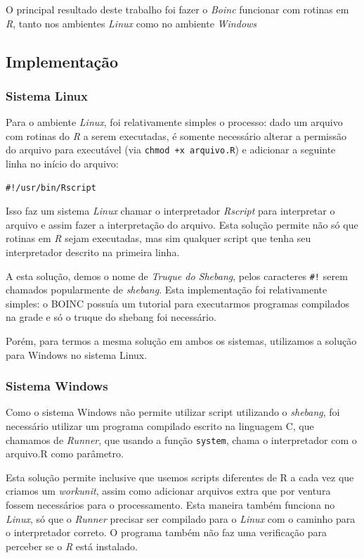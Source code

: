 O principal resultado deste trabalho foi fazer o \emph{Boinc} funcionar com rotinas em \emph{R}, tanto
nos ambientes \emph{Linux} como no ambiente \emph{Windows} %

\subsection{Implementação}

\subsubsection{Sistema Linux}

Para o ambiente \emph{Linux}, foi relativamente simples o processo: dado um arquivo com rotinas
do \emph{R} a serem executadas, é somente necessário alterar a permissão do arquivo para executável 
(via \verb#chmod +x arquivo.R#) e adicionar a seguinte linha no início do arquivo:

\begin{verbatim}
#!/usr/bin/Rscript
\end{verbatim}

Isso faz um sistema \emph{Linux} chamar o interpretador \emph{Rscript} para interpretar o arquivo  
e assim fazer a interpretação do arquivo. Esta solução permite não só que rotinas em \emph{R} sejam
executadas, mas sim qualquer script que tenha seu interpretador descrito na primeira linha.

A esta solução, demos o nome de \emph{Truque do Shebang}, pelos caracteres \verb'#!' serem chamados
popularmente de \emph{shebang}. Esta implementação foi relativamente simples: o BOINC possuía um tutorial
para executarmos programas compilados na grade e só o truque do shebang foi necessário.

Porém, para termos a mesma solução em ambos os sistemas, utilizamos a solução para
Windows no sistema Linux. 

\subsubsection{Sistema Windows} %

Como o sistema Windows não permite utilizar script utilizando o \emph{shebang}, foi necessário 
utilizar um programa compilado escrito na linguagem C, que chamamos de \emph{Runner}, 
que usando a função \verb#system#, chama o interpretador com o arquivo.R como parâmetro. 

Esta solução permite inclusive que usemos scripts diferentes de R a cada vez que criamos um 
\emph{workunit}, assim como adicionar arquivos extra que por ventura fossem necessários para
o processamento. Esta maneira também funciona no \emph{Linux}, só que o \emph{Runner} precisar
ser compilado para o \emph{Linux} com o caminho para o interpretador correto. O programa também não faz
uma verificação para perceber se o \emph{R} está instalado. 

